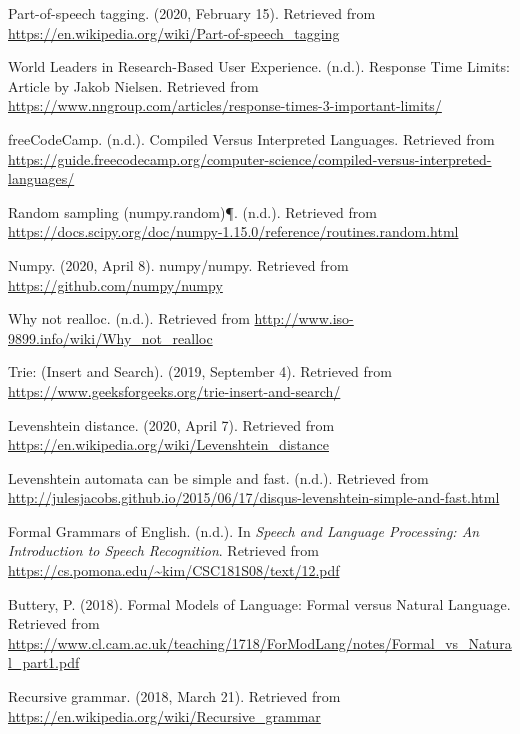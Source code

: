 \documentclass[12pt]{article}
\begin{document}
\begin{thebibliography}{20}
	\raggedright
	
	Part-of-speech tagging. (2020, February 15). Retrieved from \url{https://en.wikipedia.org/wiki/Part-of-speech_tagging}
	
	World Leaders in Research-Based User Experience. (n.d.). Response Time Limits: Article by Jakob Nielsen. Retrieved from \url{https://www.nngroup.com/articles/response-times-3-important-limits/}
	
	freeCodeCamp. (n.d.). Compiled Versus Interpreted Languages. Retrieved from \url{https://guide.freecodecamp.org/computer-science/compiled-versus-interpreted-languages/}
	
	Random sampling (numpy.random)¶. (n.d.). Retrieved from \url{https://docs.scipy.org/doc/numpy-1.15.0/reference/routines.random.html}
	
	Numpy. (2020, April 8). numpy/numpy. Retrieved from \url{https://github.com/numpy/numpy}
	
	Why not realloc. (n.d.). Retrieved from \url{http://www.iso-9899.info/wiki/Why_not_realloc}
	
	Trie: (Insert and Search). (2019, September 4). Retrieved from \url{https://www.geeksforgeeks.org/trie-insert-and-search/}
	
	Levenshtein distance. (2020, April 7). Retrieved from \url{https://en.wikipedia.org/wiki/Levenshtein_distance}
	
	Levenshtein automata can be simple and fast. (n.d.). Retrieved from \url{http://julesjacobs.github.io/2015/06/17/disqus-levenshtein-simple-and-fast.html}
	
	Formal Grammars of English. (n.d.). In \textit{Speech and Language Processing: An Introduction to Speech Recognition}. Retrieved from \url{https://cs.pomona.edu/~kim/CSC181S08/text/12.pdf}
	
	Buttery, P. (2018). Formal Models of Language: Formal versus Natural Language. Retrieved from \url{https://www.cl.cam.ac.uk/teaching/1718/ForModLang/notes/Formal_vs_Natural_part1.pdf}
	
	Recursive grammar. (2018, March 21). Retrieved from \url{https://en.wikipedia.org/wiki/Recursive_grammar}
	

\end{thebibliography}
\end{document}

